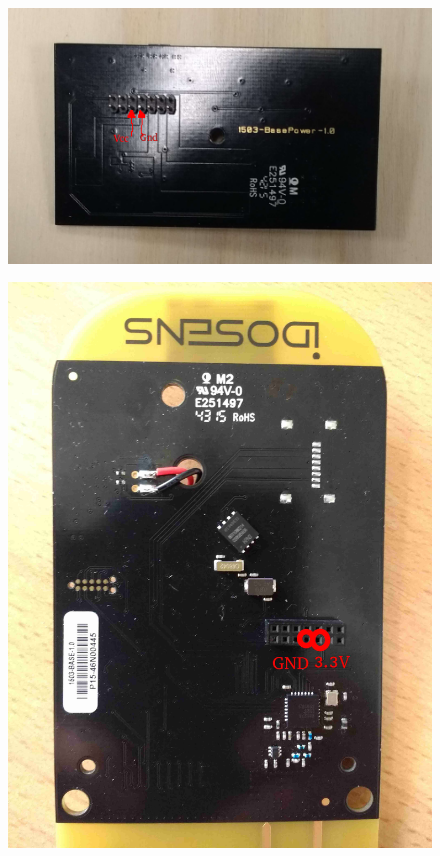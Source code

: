 \documentclass{article}
\begin{document}
\begin{figure}[H]
\begin{center}
\advance\leftskip-3cm
\advance\rightskip-3cm
\includegraphics[keepaspectratio=true,scale=0.6]{power_dos_fleches.png}

\label{visina8}
\end{center}\end{figure}

\begin{figure}[H]
\begin{center}
\advance\leftskip-3cm
\advance\rightskip-3cm
\includegraphics[keepaspectratio=true,scale=0.1]{branchement_basepower2.jpg}
\end{center}\end{figure}
\end{document}
